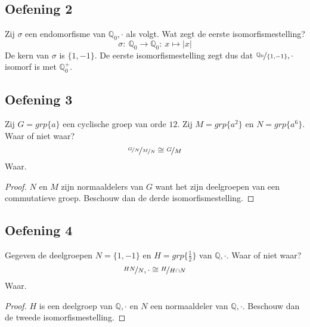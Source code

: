 \documentclass[main.tex]{subfiles}
\begin{document}
\subsection*{Oefening 2}
\label{sec:oz5-oef2}
Zij $\sigma$ een endomorfisme van $\mathbb{Q}_{0},\cdot$ als volgt. Wat zegt de eerste isomorfismestelling?
\[ \sigma:\ \mathbb{Q}_{0} \rightarrow \mathbb{Q}_{0}:\ x \mapsto |x| \]
De kern van $\sigma$ is $\{ 1,-1\}$.
De eerste isomorfismestelling zegt dus dat $\nicefrac{\mathbb{Q}_{0}}{\{ 1,-1\}},\cdot$ isomorf is met $\mathbb{Q}_{0}^{+}$.
\begin{figure}[H]
  \centering
\end{figure}

\subsection*{Oefening 3}
\label{sec:oz5-oef3}
Zij $G= grp\{a\}$ een cyclische groep van orde $12$.
Zij $M= grp\{a^{2}\}$ en $N=grp\{a^{6}\}$.
Waar of niet waar?
\[ \nicefrac{\nicefrac{G}{N}}{\nicefrac{M}{N}} \cong \nicefrac{G}{M} \]
Waar.
\begin{proof}
  $N$ en $M$ zijn normaaldelers van $G$ want het zijn deelgroepen van een commutatieve  groep.
  Beschouw dan de derde isomorfismestelling.
\end{proof}

\subsection*{Oefening 4}
\label{sec:oz5-oef4}
Gegeven de deelgroepen $N = \{ 1,-1\}$ en $H= grp\{ \frac{1}{2} \}$ van $\mathbb{Q},\cdot$.
Waar of niet waar?
\[ \nicefrac{HN}{N},\cdot \cong \nicefrac{H}{H\cap N} \]
Waar.
\begin{proof}
  $H$ is een deelgroep van $\mathbb{Q},\cdot$ en $N$ een normaaldeler van $\mathbb{Q},\cdot$.
  Beschouw dan de tweede isomorfismestelling.
\end{proof}
\end{document}
